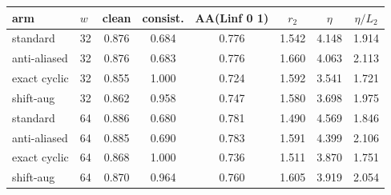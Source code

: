 \begin{tabular}{ll cc c ccc}
\toprule
arm & $w$ & clean & consist. & AA(Linf 0 1) & $r_2$ & $\eta$ & $\eta/L_2$ \\
\midrule
standard & 32 & 0.876 & 0.684 & 0.776 & 1.542 & 4.148 & 1.914 \\
anti-aliased & 32 & 0.876 & 0.683 & 0.776 & 1.660 & 4.063 & 2.113 \\
exact cyclic & 32 & 0.855 & 1.000 & 0.724 & 1.592 & 3.541 & 1.721 \\
shift-aug & 32 & 0.862 & 0.958 & 0.747 & 1.580 & 3.698 & 1.975 \\
\midrule
standard & 64 & 0.886 & 0.680 & 0.781 & 1.490 & 4.569 & 1.846 \\
anti-aliased & 64 & 0.885 & 0.690 & 0.783 & 1.591 & 4.399 & 2.106 \\
exact cyclic & 64 & 0.868 & 1.000 & 0.736 & 1.511 & 3.870 & 1.751 \\
shift-aug & 64 & 0.870 & 0.964 & 0.760 & 1.605 & 3.919 & 2.054 \\
\bottomrule
\end{tabular}